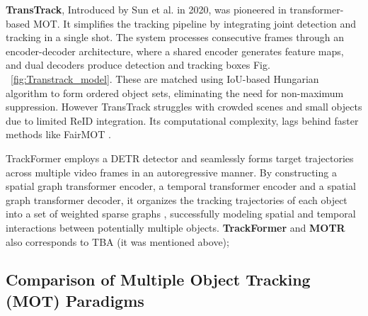 \documentclass[12pt, a4paper]{article}
\begin{document}
\textbf{TransTrack}, Introduced by Sun et al. in 2020, was pioneered in transformer-based MOT. It simplifies the tracking pipeline by integrating joint detection and tracking in a single shot. The system processes consecutive frames through an encoder-decoder architecture, where a shared encoder generates feature maps, and dual decoders produce detection and tracking boxes Fig. ~\ref{fig:Transtrack_model}. These are matched using IoU-based Hungarian algorithm to form ordered object sets, eliminating the need for non-maximum suppression. However TransTrack struggles with crowded scenes and small objects due to limited ReID integration. Its computational complexity, lags behind faster methods like FairMOT \cite{FairMOT}. 

TrackFormer \cite{trackformer} employs a DETR detector and seamlessly forms target trajectories across multiple video frames in an autoregressive manner. By constructing a spatial graph transformer encoder, a temporal transformer encoder and a spatial graph transformer decoder, it organizes the tracking trajectories of each object into a set of weighted sparse graphs \cite{k-shortest-paths-for-mot, GMCP-tracker, tensor-based-high-order-graph-matching}, successfully modeling spatial and temporal interactions between potentially multiple objects. \textbf{TrackFormer}\cite{trackformer} and \textbf{MOTR} \cite{MOTR} also corresponds to TBA (it was mentioned above); 

\subsection{Comparison of Multiple Object Tracking (MOT) Paradigms}
\end{document}
